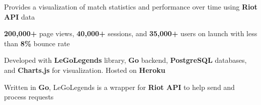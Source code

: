 \documentclass[]{peter_resume}
\begin{document}
\begin{minipage}{\textwidth}
\begin{tightemize}
\item Provides a visualization of match statistics and performance over time using \textbf{Riot API} data
\item \textbf{200,000+} page views, \textbf{40,000+} sessions, and \textbf{35,000+} users on launch with less than \textbf{8\%} bounce rate
\item Developed with \textbf{LeGoLegends} library, \textbf{Go} backend, \textbf{PostgreSQL} databases, and \textbf{Charts.js} for visualization. Hosted on \textbf{Heroku}
\end{tightemize} 
\sectionsep

\location{}
\begin{tightemize}
\item Written in \textbf{Go}, LeGoLegends is a wrapper for \textbf{Riot API} to help send and process requests
\end{tightemize} 
\sectionsep

\vspace{0.1cm}

\vspace{0.1cm}

\vspace{0.1cm}

\vspace{0.1cm}
\sectionsep

\begin{comment}
\runsubsection{Bipolar Animals}
\location{\urlstyle{same}\url{http://ba.peterli.io} \hfill Url alias generator}
\begin{tightemize}
\item A Rails web application that generates easy to remember aliases for URLs
\item Developed with \textbf{Ruby on Rails}, \textbf{PostgreSQL} databases, and hosted on \textbf{Heroku}
\end{tightemize}
\sectionsep


\end{comment}
\end{minipage}
\end{document}
